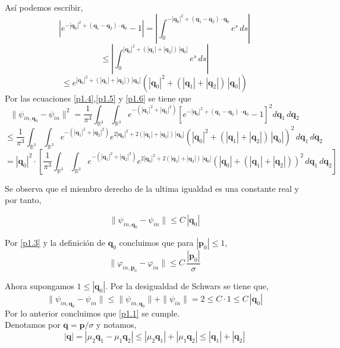 \documentclass[12pt]{book}
\numberwithin{equation}{chapter}
\def\v{\mathbf}
\def\R{\mathbb{R}}
\def\vp{\varphi}
\def\P{\mathbf{p}}
\begin{document}
As\'i podemos escribir,
\begin{equation}\label{p1.5}
\left| e^{-|\v{q}_{0}|^{2}+( \v{q}_{1}-\v{q}_{2} )\cdot \v{q}_{0}} -1 \right|=\left| \int_{0}^{-|\v{q}_{0}|^{2}+( \v{q}_{1}-\v{q}_{2} )\cdot \v{q}_{0}} e^{s}\, ds \right|
\end{equation}
$$\leq \left| \int_{0}^{|\v{q}_{0}|^{2} + (|\v{q}_{1}|+|\v{q}_{2}|)\, |\v{q}_{0}|} e^{s}\, ds \right|  $$
\begin{equation}\label{p1.6}
\leq e^{|\v{q}_{0}|^{2} + (|\v{q}_{1}|+|\v{q}_{2}|)\, |\v{q}_{0}|} ( |\v{q}_{0}|^{2} + (|\v{q}_{1}|+|\v{q}_{2}|)\, |\v{q}_{0}| )
\end{equation}
Por las ecuaciones \eqref{p1.4},\eqref{p1.5} y \eqref{p1.6} se tiene que
$$\| \psi_{in,\v{q}_{0}}-\psi_{in} \|^{2}= \frac{1}{\pi^{3}}\int_{\R^{3}} \int_{\R^{3}} e^{-(|\v{q}_{1}|^{2}+|\v{q}_{2}|^{2})} \left[ e^{-|\v{q}_{0}|^{2}+(\v{q}_{1}-\v{q}_{2})\cdot \v{q}_{0} }-1 \right]^{2} d\v{q}_{1}\, d\v{q}_{2} $$
$$ \leq \frac{1}{\pi^{3}}\int_{\R^{3}} \int_{\R^{3}} e^{-(|\v{q}_{1}|^{2}+|\v{q}_{2}|^{2})} e^{2|\v{q}_{0}|^{2} + 2(|\v{q}_{1}|+|\v{q}_{2}|)\, |\v{q}_{0}|} ( |\v{q}_{0}|^{2} + (|\v{q}_{1}|+|\v{q}_{2}|)\, |\v{q}_{0}| )^{2}  \, d\v{q}_{1}\, d\v{q}_{2} $$
$$ =|\v{q}_{0}|^{2} \cdot \left[ \frac{1}{\pi^{3}}\int_{\R^{3}} \int_{\R^{3}} e^{-(|\v{q}_{1}|^{2}+|\v{q}_{2}|^{2})} e^{2|\v{q}_{0}|^{2} + 2(|\v{q}_{1}|+|\v{q}_{2}|)\, |\v{q}_{0}|} ( |\v{q}_{0}| + (|\v{q}_{1}|+|\v{q}_{2}|) )^{2}  \, d\v{q}_{1}\, d\v{q}_{2} \right] $$

Se observa que el miembro derecho de la ultima igualdad es una constante real y por tanto,

$$ \| \psi_{in,\v{q}_{0}}-\psi_{in} \| \leq C\, |\v{q}_{0}| $$

Por \eqref{p1.3} y la definici\'on de $\v{q}_{0}$ concluimos que para $|\P_{0}|\leq 1$,
$$ \| \vp_{in,\P_{0}}-\vp_{in} \| \leq C \, \frac{|\P_{0}|}{\sigma} $$

Ahora supongamos $1 \leq |\v{q}_{0}|$. Por la desigualdad de Schwars se tiene que,
$$ \| \psi_{in,\v{q}_{0}}-\psi_{in} \| \leq \| \psi_{in,\v{q}_{0}} \| + \| \psi_{in} \|= 2 \leq C \cdot 1 \leq C \, |\v{q}_{0}| $$
Por lo anterior concluimos que \eqref{p1.1} se cumple.\\

Denotamos por $\v{q}=\P/\sigma$ y notamos,
\begin{equation}\label{p1.7.1}
|\v{q}|= | \mu_{2}\v{q}_{1} - \mu_{1}\v{q}_{2} | \leq | \mu_{2}\v{q}_{1} |+ | \mu_{1}\v{q}_{2} |\leq |\v{q}_{1}|+|\v{q}_{2}|
\end{equation}
\end{document}
